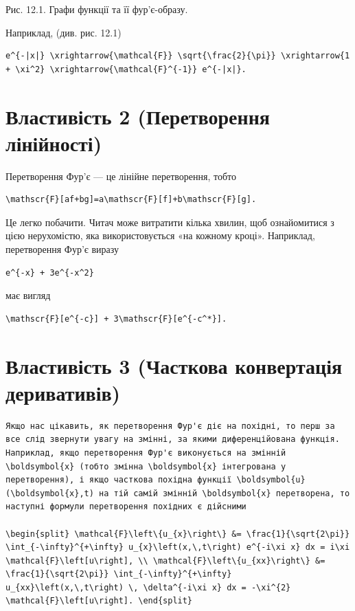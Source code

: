 \documentclass[
  ukrainian,
]{article}
\begin{document}
Рис. 12.1. Графи функції та її фур'є-образу.

Наприклад, (див. рис. 12.1)

\begin{verbatim}
e^{-|x|} \xrightarrow{\mathcal{F}} \sqrt{\frac{2}{\pi}} \xrightarrow{1 + \xi^2} \xrightarrow{\mathcal{F}^{-1}} e^{-|x|}.
\end{verbatim}

\section{Властивість 2 (Перетворення
лінійності)}\label{ux432ux43bux430ux441ux442ux438ux432ux456ux441ux442ux44c-2-ux43fux435ux440ux435ux442ux432ux43eux440ux435ux43dux43dux44f-ux43bux456ux43dux456ux439ux43dux43eux441ux442ux456}

Перетворення Фур'є --- це лінійне перетворення, тобто

\begin{verbatim}
\mathscr{F}[af+bg]=a\mathscr{F}[f]+b\mathscr{F}[g].
\end{verbatim}

Це легко побачити. Читач може витратити кілька хвилин, щоб ознайомитися
з цією нерухомістю, яка використовується «на кожному кроці». Наприклад,
перетворення Фур'є виразу

\begin{verbatim}
e^{-x} + 3e^{-x^2}
\end{verbatim}

має вигляд

\begin{verbatim}
\mathscr{F}[e^{-c}] + 3\mathscr{F}[e^{-c^*}].
\end{verbatim}

\section{Властивість 3 (Часткова конвертація
деривативів)}\label{ux432ux43bux430ux441ux442ux438ux432ux456ux441ux442ux44c-3-ux447ux430ux441ux442ux43aux43eux432ux430-ux43aux43eux43dux432ux435ux440ux442ux430ux446ux456ux44f-ux434ux435ux440ux438ux432ux430ux442ux438ux432ux456ux432}

\begin{verbatim}
Якщо нас цікавить, як перетворення Фур'є діє на похідні, то перш за все слід звернути увагу на змінні, за якими диференційована функція. Наприклад, якщо перетворення Фур'є виконується на змінній \boldsymbol{x} (тобто змінна \boldsymbol{x} інтегрована у перетворення), і якщо часткова похідна функції \boldsymbol{u}(\boldsymbol{x},t) на тій самій змінній \boldsymbol{x} перетворена, то наступні формули перетворення похідних є дійсними

\begin{split} \mathcal{F}\left\{u_{x}\right\} &= \frac{1}{\sqrt{2\pi}} \int_{-\infty}^{+\infty} u_{x}\left(x,\,t\right) e^{-i\xi x} dx = i\xi \mathcal{F}\left[u\right], \\ \mathcal{F}\left\{u_{xx}\right\} &= \frac{1}{\sqrt{2\pi}} \int_{-\infty}^{+\infty} u_{xx}\left(x,\,t\right) \, \delta^{-i\xi x} dx = -\xi^{2} \mathcal{F}\left[u\right]. \end{split}
\end{verbatim}
\end{document}
